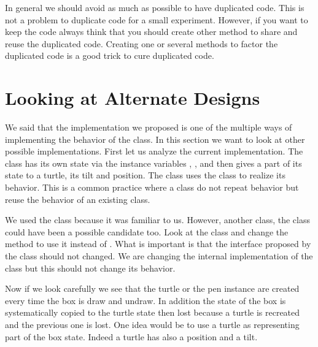 
In general we should avoid as much as possible to have duplicated
code.  This is not a problem to duplicate code for a small experiment.
However, if you want to keep the code always think that you should
create other method to share and reuse the duplicated code. Creating
one or several methods to factor the duplicated code is a good trick
to cure duplicated code.





\section{Looking at Alternate  Designs}
We said that the implementation we proposed is one of the multiple
ways of implementing the behavior of the  class. In this
section we want to look at other possible implementations.  First let
us analyze the current implementation.  The class  has its own
state via the instance variables , , and
 then gives a part of its state to a turtle, its tilt and 
position.  The  class uses the  class to realize
its behavior.  This is a common practice where a class do not repeat
behavior but reuse the behavior of an existing class.

We used the class  because it was familiar to us.  However,
another class, the class  could have been a possible candidate
too.  Look at the class  and change the method
 to use it instead of .  What is
important is that the interface proposed by the class  should
not changed.  We are changing the internal implementation of the class
but this should not change its behavior.

Now if we look carefully we see that the turtle or the pen instance
are created every time the box is draw and undraw.  In addition the
state of the box is systematically copied to the turtle state then
lost because a turtle is recreated and the previous one is lost.  One
idea would be to use a turtle as representing part of the box state.
Indeed a turtle has also a position and a tilt.  

